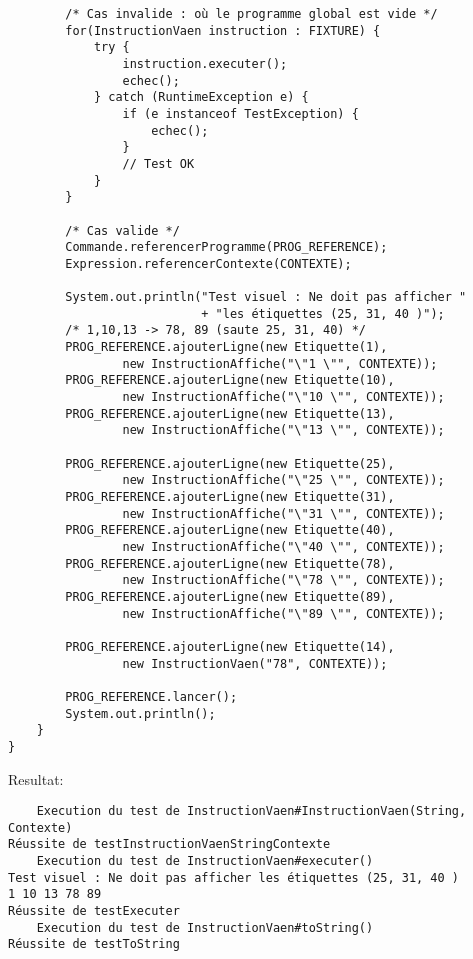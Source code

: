 \begin{enum}
\begin{verbatim}
        /* Cas invalide : où le programme global est vide */
        for(InstructionVaen instruction : FIXTURE) {
            try {
                instruction.executer();
                echec();
            } catch (RuntimeException e) {
                if (e instanceof TestException) {
                    echec();
                }
                // Test OK
            }
        }
        
        /* Cas valide */
        Commande.referencerProgramme(PROG_REFERENCE);
        Expression.referencerContexte(CONTEXTE);
        
        System.out.println("Test visuel : Ne doit pas afficher "
                           + "les étiquettes (25, 31, 40 )");
        /* 1,10,13 -> 78, 89 (saute 25, 31, 40) */
        PROG_REFERENCE.ajouterLigne(new Etiquette(1),
                new InstructionAffiche("\"1 \"", CONTEXTE));
        PROG_REFERENCE.ajouterLigne(new Etiquette(10),
                new InstructionAffiche("\"10 \"", CONTEXTE));
        PROG_REFERENCE.ajouterLigne(new Etiquette(13),
                new InstructionAffiche("\"13 \"", CONTEXTE));

        PROG_REFERENCE.ajouterLigne(new Etiquette(25),
                new InstructionAffiche("\"25 \"", CONTEXTE));
        PROG_REFERENCE.ajouterLigne(new Etiquette(31),
                new InstructionAffiche("\"31 \"", CONTEXTE));
        PROG_REFERENCE.ajouterLigne(new Etiquette(40),
                new InstructionAffiche("\"40 \"", CONTEXTE));
        PROG_REFERENCE.ajouterLigne(new Etiquette(78),
                new InstructionAffiche("\"78 \"", CONTEXTE));
        PROG_REFERENCE.ajouterLigne(new Etiquette(89),
                new InstructionAffiche("\"89 \"", CONTEXTE));

        PROG_REFERENCE.ajouterLigne(new Etiquette(14),
                new InstructionVaen("78", CONTEXTE));
                
        PROG_REFERENCE.lancer();
        System.out.println();
    }
}
\end{verbatim}
Resultat:
\begin{verbatim}
    Execution du test de InstructionVaen#InstructionVaen(String, Contexte)
Réussite de testInstructionVaenStringContexte
    Execution du test de InstructionVaen#executer()
Test visuel : Ne doit pas afficher les étiquettes (25, 31, 40 )
1 10 13 78 89 
Réussite de testExecuter
    Execution du test de InstructionVaen#toString()
Réussite de testToString
\end{verbatim}


\end{enum}
